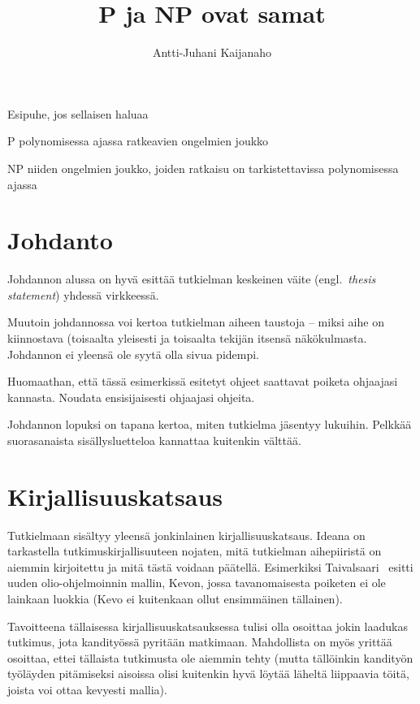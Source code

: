 \documentclass[finnish,utf8,kandi]{gradu3}
\title{P ja NP ovat samat}
\author{Antti-Juhani Kaijanaho}
\begin{document}
\maketitle
\preface
Esipuhe, jos sellaisen haluaa

\begin{thetermlist}
\item[P] polynomisessa ajassa ratkeavien ongelmien joukko \\
\item[NP] niiden ongelmien joukko, joiden ratkaisu on tarkistettavissa
  polynomisessa ajassa
\end{thetermlist}


\mainmatter

\section{Johdanto}

Johdannon alussa on hyvä esittää tutkielman keskeinen väite
(engl.~\emph{thesis statement}) yhdessä virkkeessä.

Muutoin johdannossa voi kertoa tutkielman aiheen taustoja -- miksi
aihe on kiinnostava (toisaalta yleisesti ja toisaalta tekijän itsensä
näkökulmasta.  Johdannon ei yleensä ole syytä olla sivua pidempi.

Huomaathan, että tässä esimerkissä esitetyt ohjeet saattavat poiketa
ohjaajasi kannasta.  Noudata ensisijaisesti ohjaajasi ohjeita.

Johdannon lopuksi on tapana kertoa, miten tutkielma jäsentyy lukuihin.
Pelkkää suorasanaista sisällysluetteloa kannattaa kuitenkin välttää.

\section{Kirjallisuuskatsaus}

Tutkielmaan sisältyy yleensä jonkinlainen kirjallisuuskatsaus.  Ideana
on tarkastella tutkimuskirjallisuuteen nojaten, mitä tutkielman
aihepiiristä on aiemmin kirjoitettu ja mitä tästä voidaan päätellä.
Esimerkiksi
Taivalsaari~\cite{taivalsaari93:_critic_view_inher_reusab_objec_progr}
esitti uuden olio-ohjelmoinnin mallin, Kevon, jossa tavanomaisesta
poiketen ei ole lainkaan luokkia (Kevo ei kuitenkaan ollut ensimmäinen
tällainen).

Tavoitteena tällaisessa kirjallisuuskatsauksessa tulisi olla osoittaa
jokin laadukas tutkimus, jota kandityössä pyritään matkimaan.
Mahdollista on myös yrittää osoittaa, ettei tällaista tutkimusta ole
aiemmin tehty (mutta tällöinkin kandityön työläyden pitämiseksi
aisoissa olisi kuitenkin hyvä löytää läheltä liippaavia töitä, joista
voi ottaa kevyesti mallia).
\end{document}
